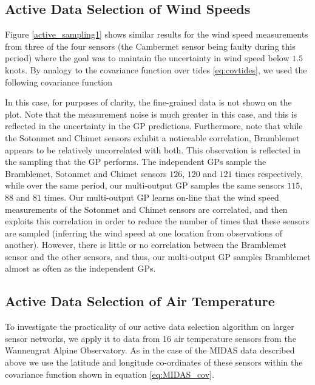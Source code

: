 \documentclass{acmsmall}
\begin{document}
\subsection{Active Data Selection of Wind Speeds}

Figure \ref{active_sampling1} shows similar results for the wind speed measurements from three of the four sensors (the Cambermet sensor being faulty during this period) where the goal was to maintain the uncertainty in wind speed below $1.5$ knots. By analogy to the covariance function over tides \eqref{eq:covtides}, we used the following covariance function

In this case, for purposes of clarity, the fine-grained data is not shown on the plot. Note that the measurement noise is much greater in this case, and this is reflected in the uncertainty in the GP predictions. Furthermore, note that while the Sotonmet and Chimet sensors exhibit a noticeable correlation, Bramblemet appears to be relatively uncorrelated with both. This observation is reflected in the sampling that the GP performs. The independent GPs sample the Bramblemet, Sotonmet and Chimet sensors $126$, $120$ and $121$ times respectively, while over the same period, our multi-output GP samples the same sensors $115$, $88$ and $81$ times. Our multi-output GP learns on-line that the wind speed measurements of the Sotonmet and Chimet sensors are correlated, and then exploits this correlation in order to reduce the number of times that these sensors are sampled (inferring the wind speed at one location from observations of another). However, there is little or no correlation between the Bramblemet sensor and the other sensors, and thus, our multi-output GP samples Bramblemet almost as often as the independent GPs.


\subsection{Active Data Selection of Air Temperature}

To investigate the practicality of our active data selection algorithm on larger sensor networks, we apply it to data from 16 air temperature sensors from the Wannengrat Alpine Observatory. As in the case of the MIDAS data described above we use the latitude and longitude co-ordinates of these sensors within the covariance function shown in equation \eqref{eq:MIDAS_cov}.
\end{document}
